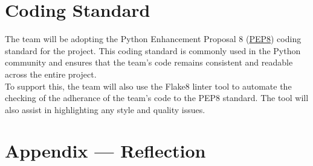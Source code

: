 \documentclass{article}
\begin{document}
\FloatBarrier 

\section{Coding Standard}
The team will be adopting the Python Enhancement Proposal 8 (\href{https://peps.python.org/pep-0008/}{PEP8}) 
coding standard for the project. This coding standard is commonly used in the 
Python community and ensures that the team's code remains 
consistent and readable across the entire project.\\
To support this, the team will also use the Flake8 linter tool to automate the 
checking of the adherance of the team's code to the PEP8 standard. The tool will
also assist in highlighting any style and quality issues.

\newpage{}

\section*{Appendix --- Reflection}


\end{document}
